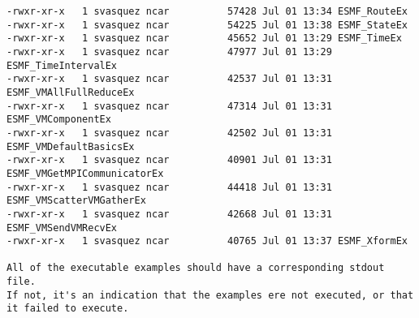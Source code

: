 \begin{verbatim}
-rwxr-xr-x   1 svasquez ncar          57428 Jul 01 13:34 ESMF_RouteEx
-rwxr-xr-x   1 svasquez ncar          54225 Jul 01 13:38 ESMF_StateEx
-rwxr-xr-x   1 svasquez ncar          45652 Jul 01 13:29 ESMF_TimeEx
-rwxr-xr-x   1 svasquez ncar          47977 Jul 01 13:29 ESMF_TimeIntervalEx
-rwxr-xr-x   1 svasquez ncar          42537 Jul 01 13:31 ESMF_VMAllFullReduceEx
-rwxr-xr-x   1 svasquez ncar          47314 Jul 01 13:31 ESMF_VMComponentEx
-rwxr-xr-x   1 svasquez ncar          42502 Jul 01 13:31 ESMF_VMDefaultBasicsEx
-rwxr-xr-x   1 svasquez ncar          40901 Jul 01 13:31 ESMF_VMGetMPICommunicatorEx
-rwxr-xr-x   1 svasquez ncar          44418 Jul 01 13:31 ESMF_VMScatterVMGatherEx
-rwxr-xr-x   1 svasquez ncar          42668 Jul 01 13:31 ESMF_VMSendVMRecvEx
-rwxr-xr-x   1 svasquez ncar          40765 Jul 01 13:37 ESMF_XformEx

All of the executable examples should have a corresponding stdout file.
If not, it's an indication that the examples ere not executed, or that it failed to execute.


\end{verbatim}
